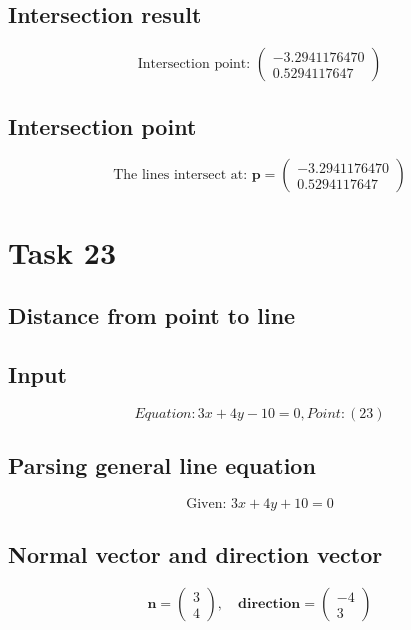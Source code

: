 \documentclass{article}
\begin{document}
\subsection*{ \vspace{1em} Intersection result}
\[
\text{Intersection point: } \begin{pmatrix}-3.2941176470 \\ 0.5294117647\end{pmatrix}
\]
\subsection*{ \vspace{1em} Intersection point}
\[
\text{The lines intersect at: } \mathbf{p} = \begin{pmatrix}-3.2941176470 \\ 0.5294117647\end{pmatrix}
\]
\bigskip

\hrulefill
\bigskip

\section*{Task 23}

\subsection*{Distance from point to line}
\subsection*{ \vspace{1em} Input}
\[
Equation: 3x + 4y - 10 = 0 , Point:  (2 3)
\]
\subsection*{ \vspace{1em} Parsing general line equation}
\[
\text{Given: } 3x + 4y + 10 = 0
\]
\subsection*{ \vspace{1em} Normal vector and direction vector}
\[
\mathbf{n} = \begin{pmatrix}3 \\ 4\end{pmatrix}, \quad
           \mathbf{direction} = \begin{pmatrix}-4 \\ 3\end{pmatrix}
\]
\end{document}
